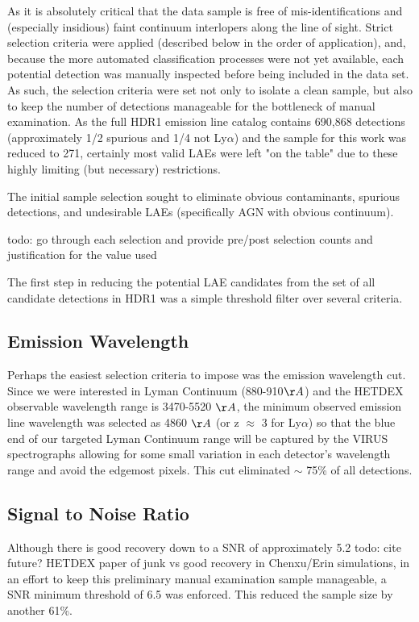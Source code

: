 \documentclass{aastex62}
\begin{document}
As it is absolutely critical that the data sample is free of mis-identifications and (especially insidious) faint continuum interlopers along the line of sight. Strict selection criteria were applied (described below in the order of application), and, because the more automated classification processes were not yet available, each potential detection was manually inspected before being included in the data set. As such, the selection criteria were set not only to isolate a clean sample, but also to keep the number of detections manageable for the bottleneck of manual examination. As the full HDR1 emission line catalog contains 690,868 detections (approximately 1/2 spurious and 1/4 not Ly$\alpha$) and the sample for this work was reduced to 271, certainly most valid LAEs were left "on the table" due to these highly limiting (but necessary) restrictions. 

The initial sample selection sought to eliminate obvious contaminants, spurious detections, and undesirable LAEs (specifically AGN with obvious continuum).

todo: go through each selection and provide pre/post selection counts and justification for the value used

The first step in reducing the potential LAE candidates from the set of all candidate detections in HDR1 was a simple threshold filter over several criteria. 

\subsection{Emission Wavelength}
Perhaps the easiest selection criteria to impose was the emission wavelength cut. Since we were interested in Lyman Continuum (880-910$\AA$) and the HETDEX observable wavelength range is 3470-5520 $\AA$, the minimum observed emission line wavelength was selected as 4860 $\AA$ (or z $\approx$ 3 for Ly$\alpha$) so that the blue end of our targeted Lyman Continuum range will be captured by the VIRUS spectrographs allowing for some small variation in each detector's wavelength range and avoid the edgemost pixels. This cut eliminated $\sim$ 75\% of all detections.

\subsection{Signal to Noise Ratio}
Although there is good recovery down to a SNR of approximately 5.2  { \color{red} todo: cite future? HETDEX paper of junk vs good recovery in Chenxu/Erin simulations}, in an effort to keep this preliminary manual examination sample manageable, a SNR minimum threshold of 6.5 was enforced. This reduced the sample size by another 61\%.
\end{document}
